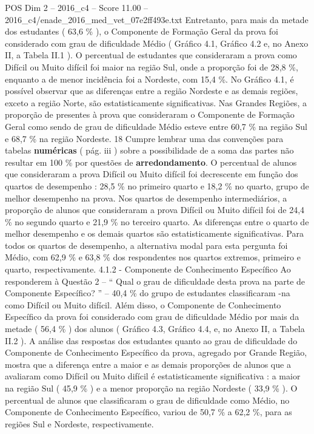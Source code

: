 \begin{textsample}{POS Dim 2 – 2016\_c4 – Score 11.00 – 2016\_c4/enade\_2016\_med\_vet\_07e2ff493e.txt}
Entretanto, para mais da metade dos estudantes ( 63,6 \% ), o Componente de Formação Geral da prova foi considerado com grau de dificuldade Médio ( Gráfico 4.1, Gráfico 4.2 e, no Anexo II, a Tabela II.1 ).
O percentual de estudantes que consideraram a prova como Difícil ou Muito difícil foi maior na região Sul, onde a proporção foi de 28,8 \%, enquanto a de menor incidência foi a Nordeste, com 15,4 \%.
No Gráfico 4.1, é possível observar que as diferenças entre a região Nordeste e as demais regiões, exceto a região Norte, são estatisticamente significativas.
Nas Grandes Regiões, a proporção de presentes à prova que consideraram o Componente de Formação Geral como sendo de grau de dificuldade Médio esteve entre 60,7 \% na região Sul e 68,7 \% na região Nordeste. 18 Cumpre lembrar uma das convenções para tabelas \textbf{numéricas} ( pág. iii ) sobre a possibilidade de a soma das partes não resultar em 100 \% por questões de \textbf{arredondamento}.
O percentual de alunos que consideraram a prova Difícil ou Muito difícil foi decrescente em função dos quartos de desempenho : 28,5 \% no primeiro quarto e 18,2 \% no quarto, grupo de melhor desempenho na prova.
Nos quartos de desempenho intermediários, a proporção de alunos que consideraram a prova Difícil ou Muito difícil foi de 24,4 \% no segundo quarto e 21,9 \% no terceiro quarto.
As diferenças entre o quarto de melhor desempenho e os demais quartos são estatisticamente significativas.
Para todos os quartos de desempenho, a alternativa modal para esta pergunta foi Médio, com 62,9 \% e 63,8 \% dos respondentes nos quartos extremos, primeiro e quarto, respectivamente. 4.1.2 - Componente de Conhecimento Específico Ao responderem à Questão 2 – “ Qual o grau de dificuldade desta prova na parte de Componente Específico? ” – 40,4 \% do grupo de estudantes classificaram -na como Difícil ou Muito difícil.
Além disso, o Componente de Conhecimento Específico da prova foi considerado com grau de dificuldade Médio por mais da metade ( 56,4 \% ) dos alunos ( Gráfico 4.3, Gráfico 4.4, e, no Anexo II, a Tabela II.2 ).
A análise das respostas dos estudantes quanto ao grau de dificuldade do Componente de Conhecimento Específico da prova, agregado por Grande Região, mostra que a diferença entre a maior e as demais proporções de alunos que a avaliaram como Difícil ou Muito difícil é estatisticamente significativa : a maior na região Sul ( 45,9 \% ) e a menor proporção na região Nordeste ( 33,9 \% ).
O percentual de alunos que classificaram o grau de dificuldade como Médio, no Componente de Conhecimento Específico, variou de 50,7 \% a 62,2 \%, para as regiões Sul e Nordeste, respectivamente.

\end{textsample}

